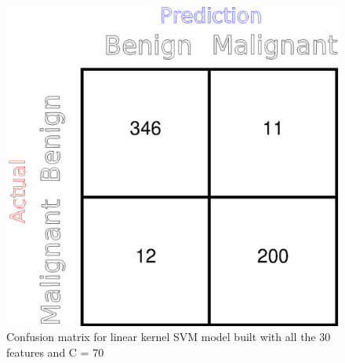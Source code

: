 \documentclass[twoside]{iitbreport}
\begin{document}
\begin{figure}[]
  \begin{center}
    \includegraphics[trim={9cm 0cm 0cm 0cm},clip,scale=0.8]{Figures/SVM_Linear_CM}
  \end{center}
  \caption{Confusion matrix for linear kernel SVM model built with all the 30 features and C = 70}
  \label{SVMLinearCM}
\end{figure}
\end{document}
